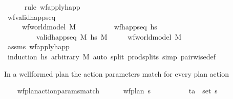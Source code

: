 \begin{isabellebody}
%
\isadelimproof
\ \ \ \ %
\endisadelimproof
%
\isatagproof
{}\isamarkupfalse%
\ {\isacharparenleft}{\kern0pt}rule\ wf{\isacharunderscore}{\kern0pt}apply{\isacharunderscore}{\kern0pt}happ{\isacharparenright}{\kern0pt}%
\endisatagproof
{\isafoldproof}%
%
\isadelimproof
\isanewline
%
\endisadelimproof
\isanewline
\ \ \isamarkupfalse%
\ wf{\isacharunderscore}{\kern0pt}valid{\isacharunderscore}{\kern0pt}happ{\isacharunderscore}{\kern0pt}seq{\isacharcolon}{\kern0pt}\ \ \ \ \ \ \ \ \ \ \ \ \ \ \ \ \ \ \ \ \ \ \ \ \ \ \ \ \ \ \ \ \ \ \ \ \ \ \ \isanewline
\ \ \ \ \ {\isachardoublequoteopen}wf{\isacharunderscore}{\kern0pt}world{\isacharunderscore}{\kern0pt}model\ M{\isachardoublequoteclose}\ \isanewline
\ \ \ \ \ \ \ \ \ {\isachardoublequoteopen}wf{\isacharunderscore}{\kern0pt}happ{\isacharunderscore}{\kern0pt}seq\ hs{\isachardoublequoteclose}\isanewline
\ \ \ \ \ \ \ \ \ {\isachardoublequoteopen}valid{\isacharunderscore}{\kern0pt}happ{\isacharunderscore}{\kern0pt}seq\ M\ hs\ M{\isacharprime}{\kern0pt}{\isachardoublequoteclose}\isanewline
\ \ \ \ \ {\isachardoublequoteopen}wf{\isacharunderscore}{\kern0pt}world{\isacharunderscore}{\kern0pt}model\ M{\isacharprime}{\kern0pt}{\isachardoublequoteclose}\isanewline
%
\isadelimproof
\ \ \ \ %
\endisadelimproof
%
\isatagproof
{}\isamarkupfalse%
\ assms\ wf{\isacharunderscore}{\kern0pt}apply{\isacharunderscore}{\kern0pt}happ\ \isamarkupfalse%
\ {\isacharparenleft}{\kern0pt}induction\ hs\ arbitrary{\isacharcolon}{\kern0pt}\ M{\isacharparenright}{\kern0pt}\ {\isacharparenleft}{\kern0pt}auto\ split{\isacharcolon}{\kern0pt}\ prod{\isachardot}{\kern0pt}splits\ simp{\isacharcolon}{\kern0pt}\ pairwise{\isacharunderscore}{\kern0pt}def{\isacharparenright}{\kern0pt}%
\endisatagproof
{\isafoldproof}%
%
\isadelimproof
%
\endisadelimproof
%
\begin{isamarkuptext}%
In a wellformed plan the action parameters match for every plan action%
\end{isamarkuptext}\isamarkuptrue%
\ \ \isamarkupfalse%
\ wf{\isacharunderscore}{\kern0pt}plan{\isacharunderscore}{\kern0pt}action{\isacharunderscore}{\kern0pt}params{\isacharunderscore}{\kern0pt}match{\isacharcolon}{\kern0pt}\ \isanewline
\ \ \ \ \ {\isachardoublequoteopen}wf{\isacharunderscore}{\kern0pt}plan\ {\isasympi}s{\isachardoublequoteclose}\ \isanewline
\ \ \ \ \ \ \ \ \ {\isachardoublequoteopen}{\isacharparenleft}{\kern0pt}t{\isacharcomma}{\kern0pt}a{\isacharparenright}{\kern0pt}\ {\isasymin}\ set\ {\isasympi}s{\isachardoublequoteclose}\ \isanewline

\end{isabellebody}
